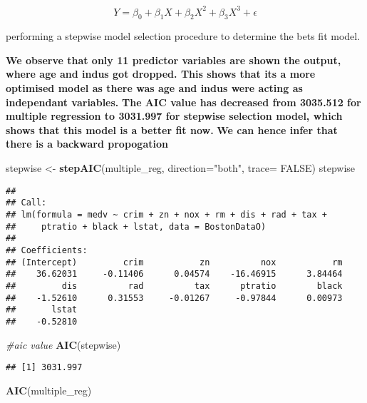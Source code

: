 \documentclass[]{article}
\newenvironment{Shaded}{\begin{snugshade}}{\end{snugshade}}
\newcommand{\CommentTok}[1]{\textcolor[rgb]{0.56,0.35,0.01}{\textit{#1}}}
\newcommand{\DataTypeTok}[1]{\textcolor[rgb]{0.13,0.29,0.53}{#1}}
\newcommand{\KeywordTok}[1]{\textcolor[rgb]{0.13,0.29,0.53}{\textbf{#1}}}
\newcommand{\NormalTok}[1]{#1}
\newcommand{\OtherTok}[1]{\textcolor[rgb]{0.56,0.35,0.01}{#1}}
\newcommand{\StringTok}[1]{\textcolor[rgb]{0.31,0.60,0.02}{#1}}
\begin{document}
\[ Y = \beta_0 + \beta_1 X + \beta_2 X^2 + \beta_3 X^3 + \epsilon \]

\item

performing a stepwise model selection procedure to determine the bets
fit model.

\textbf{We observe that only 11 predictor variables are shown the
output, where age and indus got dropped. This shows that its a more
optimised model as there was age and indus were acting as independant
variables.} \textbf{The AIC value has decreased from 3035.512 for
multiple regression to 3031.997 for stepwise selection model, which
shows that this model is a better fit now.} \textbf{We can hence infer
that there is a backward propogation }

\begin{Shaded}
\begin{Highlighting}[]
\NormalTok{stepwise <-}\StringTok{ }\KeywordTok{stepAIC}\NormalTok{(multiple_reg, }\DataTypeTok{direction=}\StringTok{"both"}\NormalTok{, }\DataTypeTok{trace=} \OtherTok{FALSE}\NormalTok{)}
\NormalTok{stepwise}
\end{Highlighting}
\end{Shaded}

\begin{verbatim}
## 
## Call:
## lm(formula = medv ~ crim + zn + nox + rm + dis + rad + tax + 
##     ptratio + black + lstat, data = BostonDataO)
## 
## Coefficients:
## (Intercept)         crim           zn          nox           rm  
##    36.62031     -0.11406      0.04574    -16.46915      3.84464  
##         dis          rad          tax      ptratio        black  
##    -1.52610      0.31553     -0.01267     -0.97844      0.00973  
##       lstat  
##    -0.52810
\end{verbatim}

\begin{Shaded}
\begin{Highlighting}[]
\CommentTok{#aic value}
\KeywordTok{AIC}\NormalTok{(stepwise)}
\end{Highlighting}
\end{Shaded}

\begin{verbatim}
## [1] 3031.997
\end{verbatim}

\begin{Shaded}
\begin{Highlighting}[]
\KeywordTok{AIC}\NormalTok{(multiple_reg)}
\end{Highlighting}
\end{Shaded}
\end{document}
